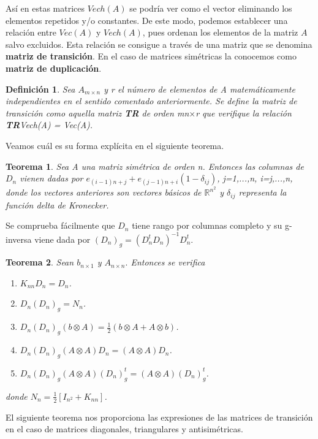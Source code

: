 \documentclass{article}
\theoremstyle{theorem-style}  %
\newtheorem{theorem}{Teorema}[section]  %
\theoremstyle{definition-style}
\newtheorem{definition}{Definición}[section]
\theoremstyle{example-style}
\theoremstyle{exercise-style}
\begin{document}
	Así en estas matrices $Vech(A)$ se podría ver como el vector eliminando los elementos repetidos y/o constantes. De este modo, podemos establecer una relación entre $Vec(A)$ y $Vech(A)$, pues ordenan los elementos de la matriz $A$ salvo excluidos. Esta relación se consigue a través de una matriz que se denomina \textbf{matriz de transición}. En el caso de matrices simétricas la conocemos como \textbf{matriz de duplicación}.
	
	\begin{definition}
		Sea $A_{m\times n}$ y r el número de elementos de A matemáticamente independientes en el sentido comentado anteriormente. Se define la matriz de transición como aquella matriz \textbf{TR} de orden mn$\times$r que verifique la relación \textbf{TR}Vech(A) = Vec(A).
	\end{definition}
	
	Veamos cuál es su forma explícita en el siguiente teorema.
	
	\begin{theorem}
		Sea A una matriz simétrica de orden n. Entonces las columnas de $D_n$ vienen dadas por $e_{(i-1)n+j}+e_{(j-1)n+i}(1-\delta_{ij})$, j=1,...,n, i=j,...,n, donde los vectores anteriores son vectores básicos de $\mathbb{R}^{n^2}$ y $\delta_{ij}$ representa la función delta de Kronecker.
	\end{theorem}
	
	Se comprueba fácilmente que $D_n$ tiene rango por columnas completo y su g-inversa viene dada por $(D_n)_g = (D^t_nD_n)^{-1}D_n^t$.
	
	\begin{theorem}
		Sean $b_{n\times 1}$ y $A_{n\times n}.$ Entonces se verifica
		\begin{enumerate}
			\item $K_{nn}D_n = D_n$.
			\item $D_n(D_n)_g=N_n$.
			\item $D_n(D_n)_g(b\otimes A) = \frac{1}{2}(b\otimes A + A\otimes b)$.
			\item $D_n(D_n)_g(A\otimes A)D_n = (A\otimes A)D_n$.
			\item $D_n(D_n)_g(A\otimes A)(D_n)_g^t = (A\otimes A)(D_n)^t_g$.
		\end{enumerate}
		donde $N_n = \frac{1}{2}[I_{n^2}+K_{nn}]$.
	\end{theorem}
	
	El siguiente teorema nos proporciona las expresiones de las matrices de transición en el caso de matrices diagonales, triangulares y antisimétricas.
	
\end{document}
